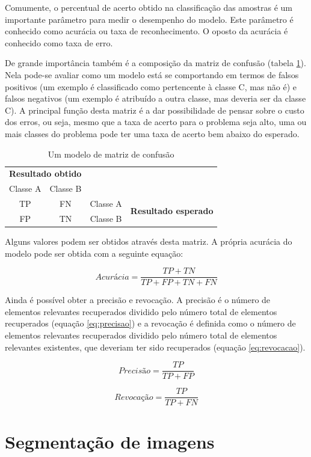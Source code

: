 Comumente, o percentual de acerto obtido na classificação das amostras é um importante parâmetro para medir o desempenho do modelo. Este parâmetro é conhecido como acurácia ou taxa de reconhecimento. O oposto da acurácia é conhecido como taxa de erro.

De grande importância também é a composição da matriz de confusão (tabela \ref{tab:matrixConfusao}). Nela pode-se avaliar como um modelo está se comportando em termos de falsos positivos (um exemplo é classificado como pertencente à classe C, mas não é) e falsos negativos (um exemplo é atribuído a outra classe, mas deveria ser da classe C). A principal função desta matriz é a dar possibilidade de pensar sobre o custo dos erros, ou seja, mesmo que a taxa de acerto para o problema seja alto, uma ou mais classes do problema pode ter uma taxa de acerto bem abaixo do esperado.

\begin{table}[h]
  \centering
  \begin{tabular}{cccc}
  \multicolumn{2}{c}{\textbf{Resultado obtido}}                  &                               &                                              \\ \cline{1-2}
  \multicolumn{1}{|c|}{Classe A} & \multicolumn{1}{c|}{Classe B} &                               &                                              \\ \cline{1-3}
  \multicolumn{1}{|c|}{TP}       & \multicolumn{1}{c|}{FN}       & \multicolumn{1}{c|}{Classe A} & \multirow{2}{*}{\textbf{Resultado esperado}} \\ \cline{1-3}
  \multicolumn{1}{|c|}{FP}       & \multicolumn{1}{c|}{TN}       & \multicolumn{1}{c|}{Classe B} &                                              \\ \cline{1-3}
  \end{tabular}
  \caption{Um modelo de matriz de confusão}
  \label{tab:matrixConfusao}
\end{table}

Alguns valores podem ser obtidos através desta matriz. A própria acurácia do modelo pode ser obtida com a seguinte equação:

\begin{equation}
  Acurácia = \frac{TP+TN}{TP+FP+TN+FN}
\label{eq:acuracia}
\end{equation}

Ainda é possível obter a precisão e revocação. A precisão é o número de elementos relevantes recuperados dividido pelo número total de elementos recuperados (equação \ref{eq:precisao}) e a revocação é definida como o número de elementos relevantes recuperados dividido pelo número total de elementos relevantes existentes, que deveriam ter sido recuperados (equação \ref{eq:revocacao}).

\begin{equation}
  Precisão = \frac{TP}{TP+FP}
\label{eq:precisao}
\end{equation}


\begin{equation}
  Revocação = \frac{TP}{TP+FN}
\label{eq:revocacao}
\end{equation}

\section{Segmentação de imagens}




